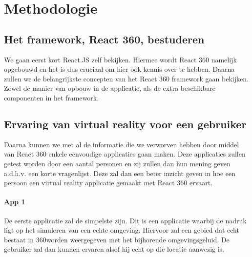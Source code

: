 
\chapter{Methodologie}
\label{ch:methodologie}


\section{Het framework, React 360, bestuderen}
\label{sec:reactvr-bestuderen}
We gaan eerst kort React.JS zelf bekijken. Hiermee wordt React 360 namelijk opgebouwd en het is dus cruciaal om hier ook kennis over te hebben. Daarna zullen we de belangrijkste concepten van het React 360 framework gaan bekijken. Zowel de manier van opbouw in de applicatie, als de extra beschikbare componenten in het framework.

\section{Ervaring van virtual reality voor een gebruiker}
\label{sec:ervaring-vr-app}
Daarna kunnen we met al de informatie die we verworven hebben door middel van React 360 enkele eenvoudige applicaties gaan maken. Deze applicaties zullen getest worden door een aantal personen en zij zullen dan hun mening geven a.d.h.v. een korte vragenlijst. Deze zal dan een beter inzicht geven in hoe een persoon een virtual reality applicatie gemaakt met React 360 ervaart.

\subsubsection{App 1}
De eerste applicatie zal de simpelste zijn. Dit is een applicatie waarbij de nadruk ligt op het simuleren van een echte omgeving. Hiervoor zal een gebied dat echt bestaat in 360\textdegree worden weergegeven met het bijhorende omgevingsgeluid. De gebruiker zal dan kunnen ervaren alsof hij echt op die locatie aanwezig is.

